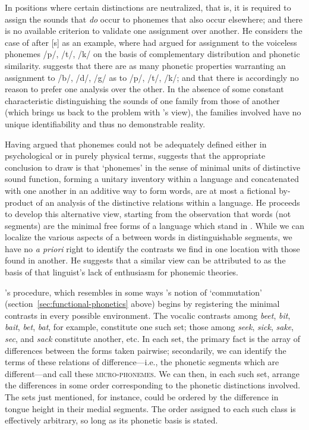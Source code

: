In positions where certain distinctions are neutralized, that is, it
is required to assign the sounds that \emph{do} occur to phonemes that
also occur elsewhere; and there is no available criterion to validate
one assignment over another. He considers the case of  
after [s] as an example, where {\Swadesh} had argued for assignment to
the voiceless phonemes /p/, /t/, /k/ on the basis of complementary
distribution and phonetic similarity. {\Twaddell} suggests that there are
as many phonetic properties warranting an assignment to /b/, /d/, /g/
as to /p/, /t/, /k/; and that there is accordingly no reason to prefer
one analysis over the other. In the absence of some constant
characteristic distinguishing the sounds of one family from those of
another (which brings us back to the problem with {\Bloomfield}'s view),
the families involved have no unique identifiability and thus no
demonstrable reality.

Having argued that phonemes could not be adequately defined either in
psychological or in purely physical terms, {\Twaddell} suggests that the
appropriate conclusion to draw is that `phonemes' in the sense of
minimal units of distinctive sound function, forming a unitary
inventory within a language and concatenated with one another in an
additive way to form words, are at most a fictional by-product of an
analysis of the distinctive relations within a language. He proceeds
to develop this alternative view, starting from the observation that
words (not segments) are the minimal free forms of a language which
stand in . While we can localize the various aspects of a
 between words in distinguishable segments, we have no \emph{a
  priori} right to identify the contrasts we find in one location with
those found in another. He suggests \citep[34]{twaddell35:on.defining}
that a similar view can be attributed to {\Jespersen} as the basis of
that linguist's lack of enthusiasm for phonemic theories.

{\Twaddell}'s procedure, which resembles in some ways {\Martinet}'s 
notion of `commutation' (section~\ref{sec:functional-phonetics} above) 
begins by registering the minimal contrasts in
every possible environment. The vocalic contrasts among \emph{beet},
\emph{bit}, \emph{bait}, \emph{bet}, \emph{bat}, for example,
constitute one such set; those among \emph{seek}, \emph{sick},
\emph{sake}, \emph{sec}, and \emph{sack} constitute another, etc. In
each set, the primary fact is the array of differences between the
forms taken pairwise; secondarily, we can identify the terms of these
relations of difference—i.e., the phonetic segments which are
different—and call these \textsc{micro-phonemes}. We can then, in each
such set, arrange the differences in some order corresponding to the
phonetic distinctions involved. The sets just mentioned, for instance,
could be ordered by the difference in tongue height in their medial
segments. The order assigned to each such class is effectively
arbitrary, so long as its phonetic basis is stated.

